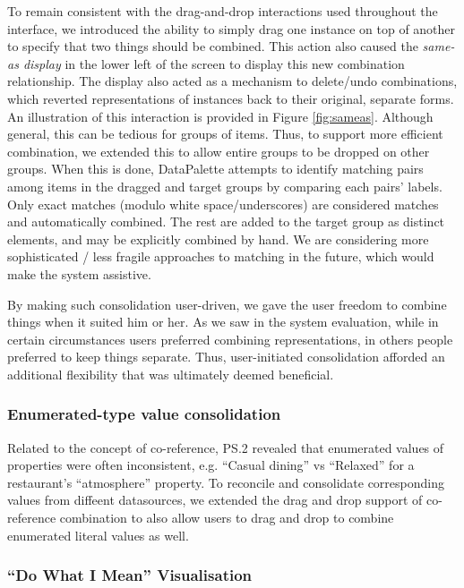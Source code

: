 \documentclass{sigchi}
\begin{document}
To remain consistent with the drag-and-drop interactions used throughout the interface, we introduced the ability to simply drag one instance on top of another to specify that two things should be combined.  This action also caused the \emph{same-as display} in the lower left of the screen to display this new combination relationship.  The display also acted as a mechanism to delete/undo combinations, which reverted representations of instances back to their original, separate forms. An illustration of this interaction is provided in Figure \ref{fig:sameas}. Although general, this can be tedious for groups of items.  Thus, to support more efficient combination, we extended this to allow entire groups to be dropped on other groups.  When this is done, DataPalette attempts to identify matching pairs among items in the dragged and target groups by comparing each pairs' labels.  Only exact matches (modulo white space/underscores) are considered matches and automatically combined.  The rest are added to the target group as distinct elements, and may be explicitly combined by hand.  We are considering more sophisticated / less fragile approaches to matching in the future, which would make the system assistive. 

By making such consolidation user-driven, we gave the user freedom to combine things when it suited him or her. As we saw in the system evaluation, while in certain circumstances users preferred combining representations, in others people preferred to keep things separate.  Thus, user-initiated consolidation afforded an additional flexibility that was ultimately deemed beneficial.

\subsubsection{Enumerated-type value consolidation}

Related to the concept of co-reference, PS.2 revealed that enumerated values of properties were often inconsistent, e.g. ``Casual dining'' vs ``Relaxed'' for a restaurant's ``atmosphere'' property. To reconcile and consolidate corresponding values from diffeent  datasources, we extended the drag and drop support of co-reference combination to also allow users to drag and drop to combine enumerated literal values as well.  

\subsubsection{``Do What I Mean'' Visualisation}
\end{document}
